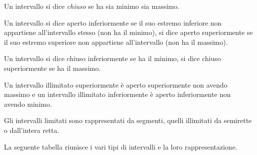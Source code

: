 \begin{newdef}{}{}
Un intervallo si dice \emph{chiuso} se  ha sia minimo sia massimo.
\end{newdef}


\begin{newdef}{}{}
Un intervallo si dice aperto inferiormente se il suo estremo inferiore non 
appartiene all'intervallo stesso (non ha il minimo), 
si dice aperto superiormente se il suo estremo superiore non appartiene 
all'intervallo (non ha il massimo).
\end{newdef}

\begin{newdef}{}{}
Un intervallo si dice chiuso inferiormente se ha il minimo, 
si dice chiuso superiormente se ha il massimo.
\end{newdef}

Un intervallo illimitato superiormente è aperto superiormente non avendo 
massimo e un intervallo illimitato inferiormente è aperto inferiormente non 
avendo minimo.

Gli intervalli limitati sono rappresentati da segmenti, quelli illimitati 
da semirette o dall'intera retta.

La seguente tabella riunisce i vari tipi di intervalli e la loro 
rappresentazione.


